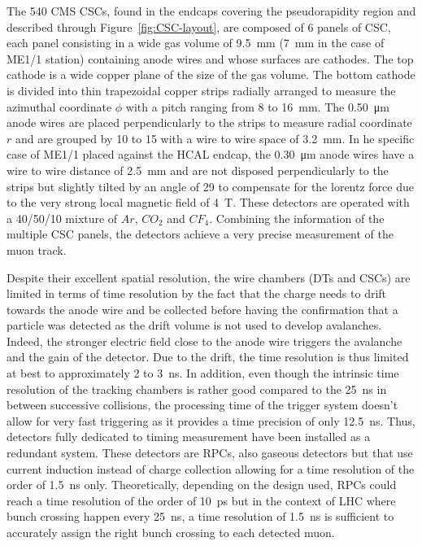 	The 540 CMS CSCs, found in the endcaps covering the pseudorapidity region  and described through Figure~\ref{fig:CSC-layout}, are composed of 6 panels of CSC, each panel consisting in a wide gas volume of \SI{9.5}{mm} (\SI{7}{mm} in the case of ME1/1 station) containing anode wires and whose surfaces are cathodes. The top cathode is a wide copper plane of the size of the gas volume. The bottom cathode is divided into thin trapezoidal copper strips radially arranged to measure the azimuthal coordinate $\phi$ with a pitch ranging from 8 to \SI{16}{mm}. The \SI{0.50}{\micro m} anode wires are placed perpendicularly to the strips to measure radial coordinate $r$ and are grouped by 10 to 15 with a wire to wire space of \SI{3.2}{mm}. In he specific case of ME1/1 placed against the HCAL endcap, the \SI{0.30}{\micro m} anode wires have a wire to wire distance of \SI{2.5}{mm} and are not disposed perpendicularly to the strips but slightly tilted by an angle of \SI{29}{\deg} to compensate for the lorentz force due to the very strong local magnetic field of \SI{4}{T}. These detectors are operated with a 40/50/10 mixture of $Ar$, $CO_2$ and $CF_4$. Combining the information of the multiple CSC panels, the detectors achieve a very precise measurement of the muon track.
	
	Despite their excellent spatial resolution, the wire chambers (DTs and CSCs) are limited in terms of time resolution by the fact that the charge needs to drift towards the anode wire and be collected before having the confirmation that a particle was detected as the drift volume is not used to develop avalanches. Indeed, the stronger electric field close to the anode wire triggers the avalanche and the gain of the detector. Due to the drift, the time resolution is thus limited at best to approximately 2 to \SI{3}{ns}. In addition, even though the intrinsic time resolution of the tracking chambers is rather good compared to the \SI{25}{ns} in between successive collisions, the processing time of the trigger system doesn't allow for very fast triggering as it provides a time precision of only \SI{12.5}{ns}. Thus, detectors fully dedicated to timing measurement have been installed as a redundant system. These detectors are RPCs, also gaseous detectors but that use current induction instead of charge collection allowing for a time resolution of the order of \SI{1.5}{ns} only. Theoretically, depending on the design used, RPCs could reach a time resolution of the order of \SI{10}{ps} but in the context of LHC where bunch crossing happen every \SI{25}{ns}, a time resolution of \SI{1.5}{ns} is sufficient to accurately assign the right bunch crossing to each detected muon.
	
